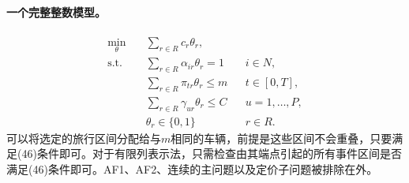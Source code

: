 \documentclass[11pt]{article}
\begin{document}
\paragraph{一个完整整数模型。}
\begin{align}
\min_{\theta}\quad &\sum_{r\in R}c_r\theta_r,\tag{44}\\
\text{s.t.}\quad &\sum_{r\in R}\alpha_{ir}\theta_r=1 &&i\in N,\tag{45}\\
&\sum_{r\in R}\pi_{tr}\theta_r\le m &&t\in[0,T],\tag{46}\\
&\sum_{r\in R}\gamma_{ur}\theta_r\le C &&u=1,\ldots,P,\tag{47}\\
&\theta_r\in\{0,1\} &&r\in R.\tag{48}
\end{align}
可以将选定的旅行区间分配给与$m$相同的车辆，前提是这些区间不会重叠，只要满足(46)条件即可。对于有限列表示法，只需检查由其端点引起的所有事件区间是否满足(46)条件即可。AF1、AF2、连续的主问题以及定价子问题被排除在外。
\end{document}
